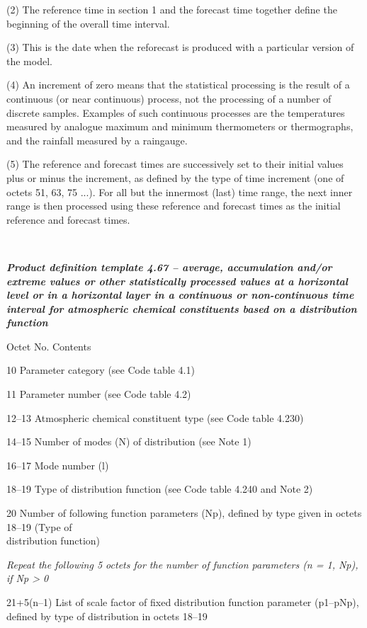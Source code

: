 (2) The reference time in section 1 and the forecast time together define the beginning of the overall time interval.

(3) This is the date when the reforecast is produced with a particular version of the model.

(4) An increment of zero means that the statistical processing is the result of a continuous (or near continuous) process, not the processing of a number of discrete samples. Examples of such continuous processes are the temperatures measured by analogue maximum and minimum thermometers or thermographs, and the rainfall measured by a raingauge.

(5) The reference and forecast times are successively set to their initial values plus or minus the increment, as defined by the type of time increment (one of octets 51, 63, 75 ...). For all but the innermost (last) time range, the next inner range is then processed using these reference and forecast times as the initial reference and forecast times.

\emph{\textbf{\\
}}

\emph{\textbf{Product definition template 4.67 -- average, accumulation and/or extreme values or other statistically processed values at a horizontal level or in a horizontal layer in a continuous or non-continuous time interval for atmospheric chemical constituents based on a distribution function}}

Octet No. Contents

10 Parameter category (see Code table 4.1)

11 Parameter number (see Code table 4.2)

12--13 Atmospheric chemical constituent type (see Code table 4.230)

14--15 Number of modes (N) of distribution (see Note 1)

16--17 Mode number (l)

18--19 Type of distribution function (see Code table 4.240 and Note 2)

20 Number of following function parameters (Np), defined by type given in octets 18--19 (Type of\\
distribution function)

\emph{Repeat the following 5 octets for the number of function parameters (n = 1, Np), if Np \textgreater{} 0}

21+5(n--1) List of scale factor of fixed distribution function parameter (p1--pNp), defined by type of distribution in octets 18--19

